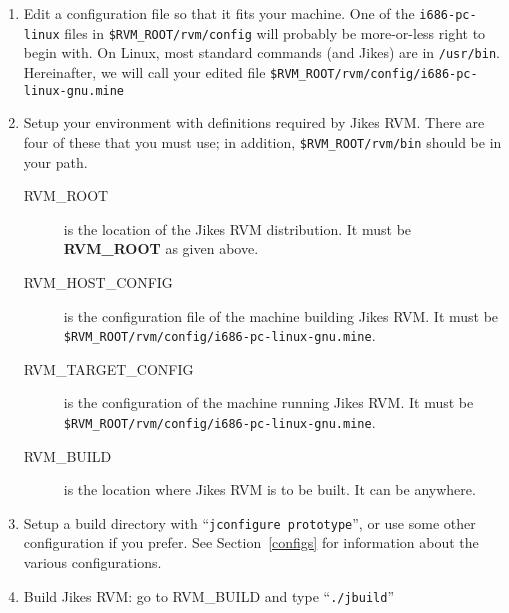 \begin{enumerate}
\item Edit a configuration file so that it fits your machine.  One of
the {\tt i686-pc-linux} files in {\tt \$RVM\_ROOT/rvm/config} will probably be
more-or-less right to begin with.  On Linux, most standard commands
(and Jikes) are in {\tt /usr/bin}.  Hereinafter, we will call your edited
file {\tt \$RVM\_ROOT/rvm/config/i686-pc-linux-gnu.mine}

\item Setup your environment with definitions required by Jikes RVM.
There are four of these that you must use; in addition,
{\tt \$RVM\_ROOT/rvm/bin} should be in your path.
\begin{description}

\item[RVM\_ROOT] is the location of the Jikes RVM distribution.  It
must be {\bf RVM\_ROOT} as given above.

\item[RVM\_HOST\_CONFIG] is the configuration file of the machine
building Jikes RVM.  It must be
{\tt \$RVM\_ROOT/rvm/config/i686-pc-linux-gnu.mine}.

\item[RVM\_TARGET\_CONFIG] is the configuration of the machine running
Jikes RVM.  It must be {\tt \$RVM\_ROOT/rvm/config/i686-pc-linux-gnu.mine}.

\item[RVM\_BUILD] is the location where Jikes RVM is to be built.  It
can be anywhere.
\end{description}

\item Setup a build directory with ``{\tt jconfigure prototype}'', or
use some other configuration if you prefer. See Section~\ref{configs}
for information about the various configurations.

\item Build Jikes RVM: go to RVM\_BUILD and type ``{\tt ./jbuild}''

\end{enumerate}

\newcommand{\gccURL}{ftp://ftp.gnu.org/gnu/gcc}
\newcommand{\glibcURL}{ftp://ftp.gnu.org/gnu/glibc}
\newcommand{\makeURL}{ftp://ftp.gnu.org/gnu/make}
\newcommand{\tarURL}{ftp://ftp.gnu.org/gnu/tar}
\newcommand{\autoconfURL}{ftp://ftp.gnu.org/gnu/autoconf}
\newcommand{\automakeURL}{ftp://ftp.gnu.org/gnu/automake}
\newcommand{\linuxPPCJDKURL}{http://www.ibm.com/java/jdk/linux/index.html}
\newcommand{\linuxKernelURL}{http://www.kernel.org}

